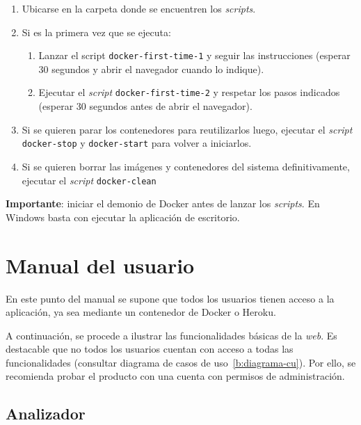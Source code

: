 \begin{enumerate}
	\item Ubicarse en la carpeta donde se encuentren los \textit{scripts}.
	\item Si es la primera vez que se ejecuta:
	\begin{enumerate}
	\item Lanzar el script \texttt{docker-first-time-1} y seguir las instrucciones (esperar 30 segundos y abrir el navegador cuando lo indique).
	\item Ejecutar el \textit{script} \texttt{docker-first-time-2} y respetar los pasos indicados (esperar 30 segundos antes de abrir el navegador).
	\end{enumerate}
	\item Si se quieren parar los contenedores para reutilizarlos luego, ejecutar el \textit{script} \texttt{docker-stop} y \texttt{docker-start} para volver a iniciarlos.
	\item Si se quieren borrar las imágenes y contenedores del sistema definitivamente, ejecutar el \textit{script} \texttt{docker-clean}
\end{enumerate}

\textbf{Importante}: iniciar el demonio de Docker antes de lanzar los \textit{scripts}. En Windows basta con ejecutar la aplicación de escritorio.

\section{Manual del usuario}

En este punto del manual se supone que todos los usuarios tienen acceso a la aplicación, ya sea mediante un contenedor de Docker o Heroku.

A continuación, se procede a ilustrar las funcionalidades básicas de la \textit{web}. Es destacable que no todos los usuarios cuentan con acceso a todas las funcionalidades (consultar diagrama de casos de uso~\ref{b:diagrama-cu}). Por ello, se recomienda probar el producto con una cuenta con permisos de administración.


\subsection{Analizador}
\label{s-e:analizador}

